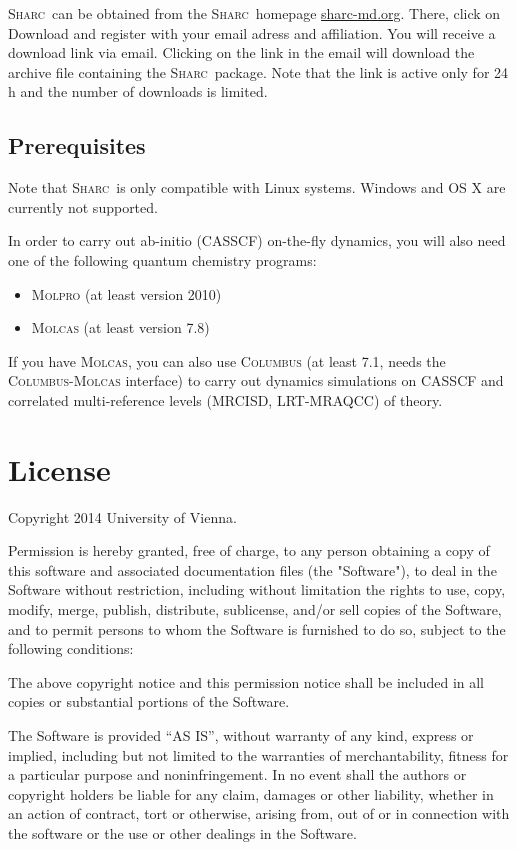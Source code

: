 \documentclass[a4paper,11pt,DIV=15,openany,twoside=false]{scrbook}
\newcommand{\sharc}{\textsc{Sharc}}
\newenvironment{example}{
  \vspace{0mm}
  \definecolor{shadecolor}{HTML}{BBDDFF}
  \begin{shaded}
  \begin{minipage}{0.9\textwidth}
}{
  \end{minipage}
  \end{shaded}
}
\begin{document}
\sharc\ can be obtained from the \sharc\ homepage \href{http://sharc-md.org}{sharc-md.org}. There, click on Download and register with your email adress and affiliation. You will receive a download link via email. Clicking on the link in the email will download the archive file containing the \sharc\ package. Note that the link is active only for 24 h and the number of downloads is limited.

\subsection{Prerequisites}

Note that \sharc\ is only compatible with Linux systems. Windows and OS X are currently not supported. 

In order to carry out ab-initio (CASSCF) on-the-fly dynamics, you will also need one of the following quantum chemistry programs:
\begin{itemize}
  \item \textsc{Molpro} (at least version 2010)
  \item \textsc{Molcas} (at least version 7.8)
\end{itemize}
If you have \textsc{Molcas}, you can also use \textsc{Columbus} (at least 7.1, needs the \textsc{Columbus}-\textsc{Molcas} interface) to carry out dynamics simulations on CASSCF and correlated multi-reference levels (MRCISD, LRT-MRAQCC) of theory.

\section{License}

\begin{example}
Copyright 2014 University of Vienna.

\medskip

Permission is hereby granted, free of charge, to any person obtaining a copy
of this software and associated documentation files (the "Software"), to deal
in the Software without restriction, including without limitation the rights
to use, copy, modify, merge, publish, distribute, sublicense, and/or sell
copies of the Software, and to permit persons to whom the Software is
furnished to do so, subject to the following conditions:

The above copyright notice and this permission notice shall be included in
all copies or substantial portions of the Software.

The Software is provided ``AS IS'', without warranty of any kind, express or
implied, including but not limited to the warranties of merchantability,
fitness for a particular purpose and noninfringement. In no event shall the
authors or copyright holders be liable for any claim, damages or other
liability, whether in an action of contract, tort or otherwise, arising from,
out of or in connection with the software or the use or other dealings in
the Software.
\end{example}
\end{document}
